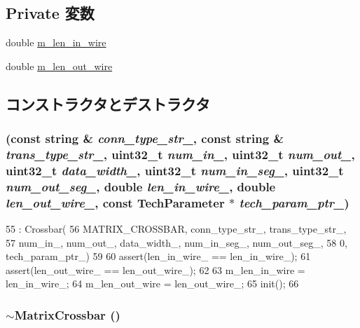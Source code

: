 \subsection*{Private 変数}
\begin{DoxyCompactItemize}
\item 
double \hyperlink{classMatrixCrossbar_aff2fda531349c91521ef8a9ae4fdabb7}{m\_\-len\_\-in\_\-wire}
\item 
double \hyperlink{classMatrixCrossbar_a401bc9c8a912bebae3e0361bdb4c6235}{m\_\-len\_\-out\_\-wire}
\end{DoxyCompactItemize}


\subsection{コンストラクタとデストラクタ}
\hypertarget{classMatrixCrossbar_ad6fae5a13780d51dbd7d618caba5660b}{
\subsubsection[{MatrixCrossbar}]{ (const string \& {\em conn\_\-type\_\-str\_\-}, \/  const string \& {\em trans\_\-type\_\-str\_\-}, \/  {\bf uint32\_\-t} {\em num\_\-in\_\-}, \/  {\bf uint32\_\-t} {\em num\_\-out\_\-}, \/  {\bf uint32\_\-t} {\em data\_\-width\_\-}, \/  {\bf uint32\_\-t} {\em num\_\-in\_\-seg\_\-}, \/  {\bf uint32\_\-t} {\em num\_\-out\_\-seg\_\-}, \/  double {\em len\_\-in\_\-wire\_\-}, \/  double {\em len\_\-out\_\-wire\_\-}, \/  const {\bf TechParameter} $\ast$ {\em tech\_\-param\_\-ptr\_\-})}}
\label{classMatrixCrossbar_ad6fae5a13780d51dbd7d618caba5660b}



\begin{DoxyCode}
55           : Crossbar(
56             MATRIX_CROSSBAR, conn_type_str_, trans_type_str_, 
57             num_in_, num_out_, data_width_, num_in_seg_, num_out_seg_, 
58             0, tech_param_ptr_)
59 {
60     assert(len_in_wire_ == len_in_wire_);
61     assert(len_out_wire_ == len_out_wire_);
62 
63     m_len_in_wire = len_in_wire_;
64     m_len_out_wire = len_out_wire_;
65     init();
66 }
\end{DoxyCode}
\hypertarget{classMatrixCrossbar_a55d5985b387f1147e082dfe5e55e79ee}{
\subsubsection[{$\sim$MatrixCrossbar}]{\setlength{\rightskip}{0pt plus 5cm}$\sim${\bf MatrixCrossbar} ()}}
\label{classMatrixCrossbar_a55d5985b387f1147e082dfe5e55e79ee}



